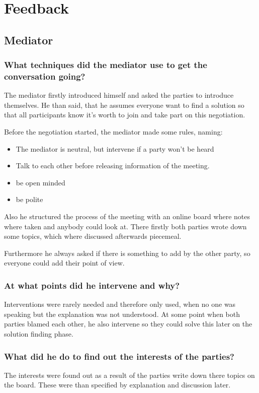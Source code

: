 \documentclass[11pt,fleqn]{book} %
\begin{document}
\chapter{Feedback}
\section{Mediator}
\subsection{What techniques did the mediator use to get the conversation going?}
The mediator firstly introduced himself and asked the parties to introduce themselves.
He than said, that he assumes everyone want to find a solution so that all participants know it's worth to join and take part on this negotiation.

Before the negotiation started, the mediator made some rules, naming:
\begin{itemize}
	\item The mediator is neutral, but intervene if a party won't be heard
	\item Talk to each other before releasing information of the meeting.
	\item be open minded
	\item be polite
	
\end{itemize}

Also he structured the process of the meeting with an online board where notes where taken and anybody could look at.
There firstly both parties wrote down some topics, which where discussed afterwards piecemeal.

Furthermore he always asked if there is something to add by the other party, so everyone could add their point of view.

\subsection{At what points did he intervene and why?}
Interventions were rarely needed and therefore only used, when no one was speaking but the explanation was not understood.
At some point when both parties blamed each other, he also intervene so they could solve this later on the solution finding phase.

\subsection{What did he do to find out the interests of the parties?}
The interests were found out as a result of the parties write down there topics on the board. These were than specified by explanation and discussion later.
\end{document}
